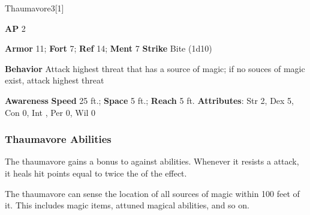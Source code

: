 \begin{monsection}{Thaumavore}{3}[1]
\vspace{-1em}\vspace{-1em}
\begin{spellcontent}
\begin{spelltargetinginfo}
{\textbf{AP} 2}

\pari \textbf{Armor} 11;
\textbf{Fort} 7;
\textbf{Ref} 14;
\textbf{Ment} 7
\pari \textbf{Strike} Bite  (1d10)



\pari \textbf{Behavior} Attack highest threat that has a source of magic; if no souces of magic exist, attack highest threat
\end{spelltargetinginfo}
\end{spellcontent}

\begin{monsterfooter}
\pari \textbf{Awareness} 
\pari \textbf{Speed} 25 ft.;
\textbf{Space} 5 ft.;
\textbf{Reach} 5 ft.
\pari \textbf{Attributes}:
Str 2,
Dex 5,
Con 0,
Int ,
Per 0,
Wil 0
\end{monsterfooter}
\end{monsection}


\subsubsection{Thaumavore Abilities}

The thaumavore gains a  bonus to  against  abilities.
Whenever it resists a  attack, it heals hit points equal to twice the  of the effect.

\vspace{0.5em}
The thaumavore can sense the location of all sources of magic within 100 feet of it.
This includes magic items, attuned magical abilities, and so on.

